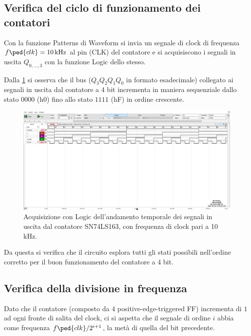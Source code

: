 \documentclass[10pt, a4paper, italian]{article}
\begin{document}
\subsection{Verifica del ciclo di funzionamento dei contatori}
\label{sec: count_base}
Con la funzione Patterns di Waveform si invia un segnale di clock di
frequenza $f\ped{clk} = \SI{10}{k\Hz}$ al pin (CLK) del contatore e si
acquisiscono i segnali in uscita $Q_{0, \ldots, 3}$ con la funzione Logic
dello stesso.

Dalla \cref{fig: Count_Clock} si osserva che il bus ($Q_3 Q_2 Q_1 Q_0$ in
formato esadecimale) collegato ai segnali in uscita dal contatore a 4 bit
incrementa in maniera sequenziale dallo stato $0000$ (h0) fino allo stato
$1111$ (hF) in ordine crescente.
\begin{figure}[htbp]
\centering
	\includegraphics[width=\textwidth]{5.b}
	\caption{Acquisizione con Logic dell'andamento temporale dei segnali in
	uscita dal contatore SN74LS163, con frequenza di clock pari a 10 kHz.
	\label{fig: Count_Clock}}
\end{figure}

Da questa si verifica che il circuito esplora tutti gli stati possibili
nell'ordine corretto per il buon funzionamento del contatore a 4 bit.

\subsection{Verifica della divisione in frequenza}
Dato che il contatore (composto da 4 positive-edge-triggered FF) incrementa
di $1$ ad ogni fronte di salita del clock, ci si aspetta che il segnale di
ordine $i$ abbia come frequenza $f\ped{clk}/2^{i+1}$, la metà di quella del
bit precedente.
\end{document}
